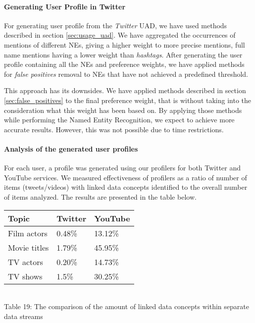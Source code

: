 \paragraph{Generating User Profile in Twitter}

For generating user profile from the \textit{Twitter} UAD, we have used methods
described in section \ref{sec:usage_uad}. We have aggregated the occurrences
of mentions of different NEs, giving a higher weight to more precise mentions, \eg
full name mentions having a lower weight than \textit{hashtags}. After
generating the user profile containing all the NEs and preference weights, we have
applied methods for \textit{false positives} removal to NEs that have not achieved
a predefined threshold.

This approach has its downsides. We have applied methods described in section \ref{sec:false_positives}
to the final preference weight, that is without taking into the consideration what
this weight has been based on. By applying those methods while performing the Named Entity Recognition,
we expect to achieve more accurate results. However, this was not possible due to time restrictions.

\paragraph{Analysis of the generated user profiles}

For each user, a profile was generated using our profilers for both Twitter and
YouTube services. We measured effectiveness of profilers as a ratio of number of
items (tweets/videos) with linked data concepts identified to the overall number
of items analyzed. The results are presented in the table below.

\begin{center}
  \begin{tabular}{| l | l | l |}
  Topic & Twitter & YouTube \\ \hline
  Film actors & 0.48\% & 13.12\% \\
  Movie titles & 1.79\% & 45.95\% \\
  TV actors & 0.20\% & 14.73\% \\
  TV shows & 1.5\% & 30.25\% \\
  \end{tabular} \\
  Table 19: The comparison of the amount of linked data concepts within separate data streams \\
\end{center}

